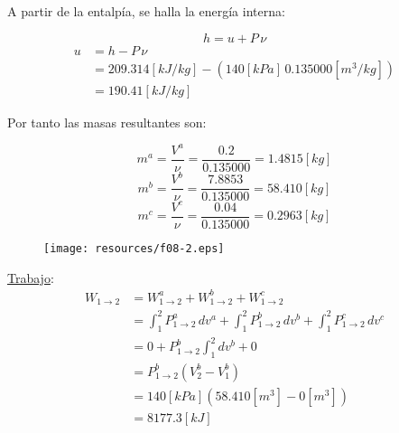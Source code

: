 \documentclass[letter,11pt]{article}
\begin{document}
\begin{enumerate}
A partir de la entalpía, se halla la energía interna:

\begin{equation*}
    h = u + P\,\nu
\end{equation*}
\begin{equation*}
    \begin{split}
        u &= h - P\,\nu \\
          &= 209.314[kJ/kg] - (140[kPa]\,0.135000[m^3/kg]) \\
          &= 190.41[kJ/kg]
    \end{split}
\end{equation*}

Por tanto las masas resultantes son:

\begin{equation*}
    m^a = \frac{V^a}{\nu} = \frac{0.2}{0.135000} = 1.4815[kg]
\end{equation*}
\begin{equation*}
    m^b = \frac{V^b}{\nu} = \frac{7.8853}{0.135000} = 58.410[kg]
\end{equation*}
\begin{equation*}
    m^c = \frac{V^c}{\nu} = \frac{0.04}{0.135000} = 0.2963[kg]
\end{equation*}

\begin{figure}[H]
\centering
\texttt{[image: resources/f08-2.eps]}
\end{figure}

\underline{Trabajo}: \\
\begin{equation*}
    \begin{split}
    W_{1\rightarrow 2} &= W_{1\rightarrow 2}^a + W_{1\rightarrow 2}^b
                          + W_{1\rightarrow 2}^c \\
                       &= \int_1^2 P_{1\rightarrow 2}^a\,dv^a
                          + \int_1^2 P_{1\rightarrow 2}^b\,dv^b
                          + \int_1^2 P_{1\rightarrow 2}^c\,dv^c \\
                       &= 0 + P_{1\rightarrow 2}^b \int_1^2 dv^b + 0 \\
                       &= P_{1\rightarrow 2}^b (V_2^b - V_1^b) \\
                       &= 140[kPa](58.410[m^3]-0[m^3]) \\
                       &= 8177.3[kJ]
    \end{split}
\end{equation*}


\end{enumerate}
\end{document}
